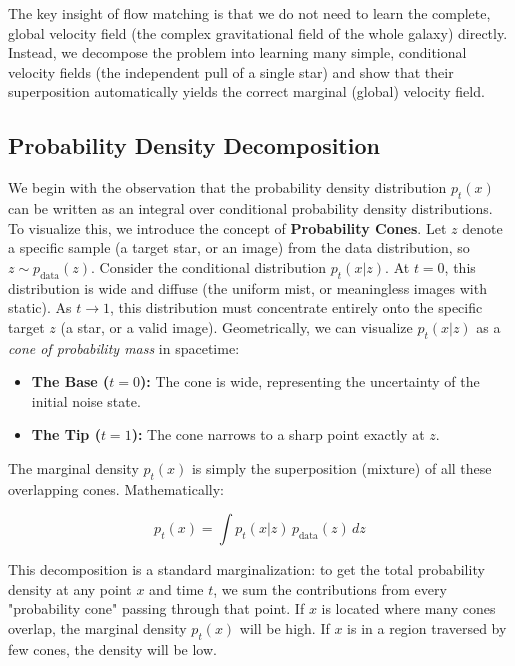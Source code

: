\documentclass{book}
\begin{document}
The key insight of flow matching is that we do not need to learn the complete, global velocity field (the complex gravitational field of the whole galaxy) directly. Instead, we decompose the problem into learning many simple, conditional velocity fields (the independent pull of a single star) and show that their superposition automatically yields the correct marginal (global) velocity field.

\subsection{Probability Density Decomposition}

We begin with the observation that the probability density distribution $p_t(x)$ can be written as an integral over conditional probability density distributions. To visualize this, we introduce the concept of \textbf{Probability Cones}.
Let $z$ denote a specific sample (a target star, or an image) from the data distribution, so $z \sim p_{\text{data}}(z)$.
Consider the conditional distribution $p_t(x|z)$. At $t=0$, this distribution is wide and diffuse (the uniform mist, or meaningless images with static). As $t \to 1$, this distribution must concentrate entirely onto the specific target $z$ (a star, or a valid image). Geometrically, we can visualize $p_t(x|z)$ as a \textit{cone of probability mass} in spacetime:
\begin{itemize}
    \item \textbf{The Base ($t=0$):} The cone is wide, representing the uncertainty of the initial noise state.
    \item \textbf{The Tip ($t=1$):} The cone narrows to a sharp point exactly at $z$.
\end{itemize}

The marginal density $p_t(x)$ is simply the superposition (mixture) of all these overlapping cones. Mathematically:

\begin{equation} \label{eq:marginal_density}
p_t(x) = \int p_t(x|z) \, p_{\text{data}}(z) \, dz
\end{equation}

This decomposition is a standard marginalization: to get the total probability density at any point $x$ and time $t$, we sum the contributions from every "probability cone" passing through that point. If $x$ is located where many cones overlap, the marginal density $p_t(x)$ will be high. If $x$ is in a region traversed by few cones, the density will be low.
\end{document}
